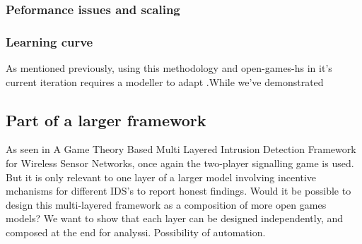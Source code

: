 \subsubsection{Peformance issues and scaling}
\subsubsection{Learning curve}
As mentioned previously, using this methodology and open-games-hs in it's current iteration requires a modeller to adapt .While we've demonstrated 
\subsection{Part of a larger framework}
As seen in A Game Theory Based Multi Layered Intrusion Detection Framework
for Wireless Sensor Networks, once again the two-player signalling game is used. But it is only relevant to one layer of a larger model involving incentive mchanisms for different IDS's to report honest findings. Would it be possible to design this multi-layered framework as a composition of more open games models? We want to show that each layer can be designed independently, and composed at the end for analyssi.
Possibility of automation.

